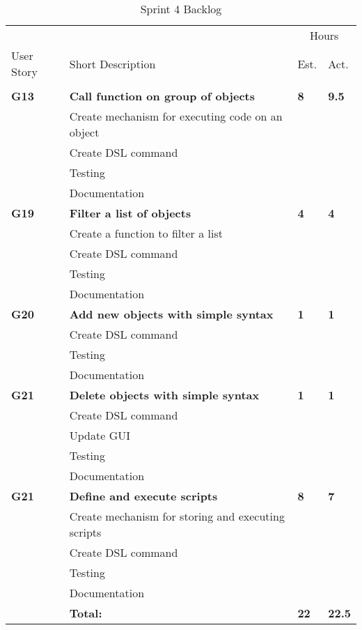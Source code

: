 \begin{table}
\caption{Sprint 4 Backlog}
\centering
\begin{tabular}{ l p{8cm} l l }
\hline 
			&				&\multicolumn{2}{c}{Hours}			\\
 User Story	& Short Description		&Est.		&Act.	                               \\ 
\hline \\ [-2.0ex]
 
 \bf{G13}	  &\bf{Call function on group of objects}		&\bf{8}		&\bf{9.5}		     \\
		  &Create mechanism for executing code on an object	&			&		\\
		  &Create DSL command						&			&		\\
		  &Testing								&			&		\\
		  &Documentation							&			&		\\

 \bf{G19}     &\bf{Filter a list of objects} 				&\bf{4}		&\bf{4}               \\ 
		  &Create a function to filter a list				&			&		\\
		  &Create DSL command						&			&		\\
		  &Testing								&			&		\\
		  &Documentation							&			&		\\

 \bf{G20}     &\bf{Add new objects with simple syntax} 		&\bf{1}		&\bf{1}		     \\ 
		  &Create DSL command						&			&		\\
		  &Testing								&			&		\\
		  &Documentation							&			&		\\

 \bf{G21}   	&\bf{Delete objects with simple syntax}			&\bf{1}		&\bf{1}		     \\ 
		  &Create DSL command						&			&		\\
		  &Update GUI								&			&		\\
		  &Testing								&			&		\\
		  &Documentation							&			&		\\

 \bf{G21}   	&\bf{Define and execute scripts}				&\bf{8}		&\bf{7}		     \\ 
		  &Create mechanism for storing and executing scripts	&			&		\\
		  &Create DSL command						&			&		\\
		  &Testing								&			&		\\
		  &Documentation							&			&		\\

\hline 
		  &\bf{Total:}						&\bf{22}		&\bf{22.5}		\\
\hline
\end{tabular}
\label{table:sp4backlog}
\end{table}

